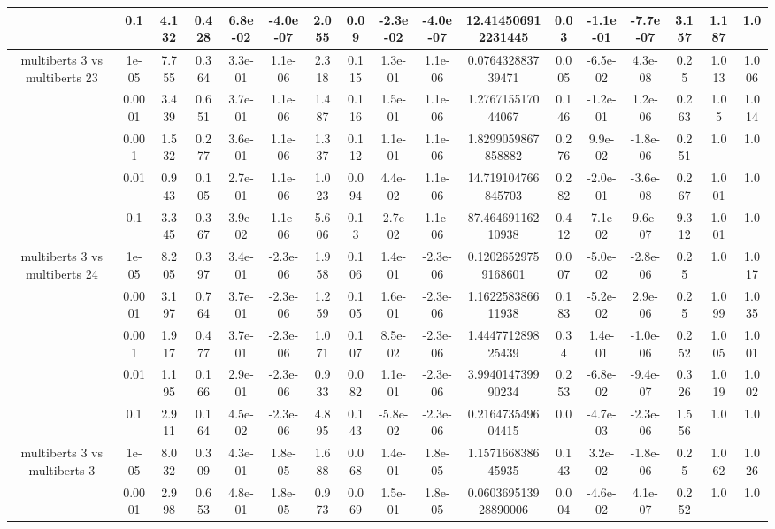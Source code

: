 \begin{tabular}{|c|c|c|c|c|c|c|c|c|c|c|c|c|c|c|c|c|}
 & 0.1 & 4.132 & 0.428 & 6.8e-02 & -4.0e-07 & 2.055 & 0.09 & -2.3e-02 & -4.0e-07 & 12.414506912231445 & 0.03 & -1.1e-01 & -7.7e-07 & 3.157 & 1.187 & 1.0 \\
\hline
\multirow{5}{*}{multiberts 3 vs multiberts 23} & 1e-05 & 7.755 & 0.364 & 3.3e-01 & 1.1e-06 & 2.318 & 0.115 & 1.3e-01 & 1.1e-06 & 0.076432883739471 & 0.005 & -6.5e-02 & 4.3e-08 & 0.25 & 1.013 & 1.006 \\
 & 0.0001 & 3.439 & 0.651 & 3.7e-01 & 1.1e-06 & 1.487 & 0.116 & 1.5e-01 & 1.1e-06 & 1.276715517044067 & 0.146 & -1.2e-01 & 1.2e-06 & 0.263 & 1.05 & 1.014 \\
 & 0.001 & 1.532 & 0.277 & 3.6e-01 & 1.1e-06 & 1.337 & 0.112 & 1.1e-01 & 1.1e-06 & 1.8299059867858882 & 0.276 & 9.9e-02 & -1.8e-06 & 0.251 & 1.0 & 1.0 \\
 & 0.01 & 0.943 & 0.105 & 2.7e-01 & 1.1e-06 & 1.023 & 0.094 & 4.4e-02 & 1.1e-06 & 14.719104766845703 & 0.282 & -2.0e-01 & -3.6e-08 & 0.267 & 1.001 & 1.0 \\
 & 0.1 & 3.345 & 0.367 & 3.9e-02 & 1.1e-06 & 5.606 & 0.13 & -2.7e-02 & 1.1e-06 & 87.46469116210938 & 0.412 & -7.1e-02 & 9.6e-07 & 9.312 & 1.001 & 1.0 \\
\hline
\multirow{5}{*}{multiberts 3 vs multiberts 24} & 1e-05 & 8.205 & 0.397 & 3.4e-01 & -2.3e-06 & 1.958 & 0.106 & 1.4e-01 & -2.3e-06 & 0.12026529759168601 & 0.007 & -5.0e-02 & -2.8e-06 & 0.25 & 1.0 & 1.017 \\
 & 0.0001 & 3.197 & 0.764 & 3.7e-01 & -2.3e-06 & 1.259 & 0.105 & 1.6e-01 & -2.3e-06 & 1.162258386611938 & 0.183 & -5.2e-02 & 2.9e-06 & 0.25 & 1.099 & 1.035 \\
 & 0.001 & 1.917 & 0.477 & 3.7e-01 & -2.3e-06 & 1.071 & 0.107 & 8.5e-02 & -2.3e-06 & 1.444771289825439 & 0.34 & 1.4e-01 & -1.0e-06 & 0.252 & 1.005 & 1.001 \\
 & 0.01 & 1.195 & 0.166 & 2.9e-01 & -2.3e-06 & 0.933 & 0.082 & 1.1e-01 & -2.3e-06 & 3.994014739990234 & 0.253 & -6.8e-02 & -9.4e-07 & 0.326 & 1.019 & 1.002 \\
 & 0.1 & 2.911 & 0.164 & 4.5e-02 & -2.3e-06 & 4.895 & 0.143 & -5.8e-02 & -2.3e-06 & 0.216473549604415 & 0.0 & -4.7e-03 & -2.3e-06 & 1.556 & 1.0 & 1.0 \\
\hline
\multirow{5}{*}{multiberts 3 vs multiberts 3} & 1e-05 & 8.032 & 0.309 & 4.3e-01 & 1.8e-05 & 1.688 & 0.068 & 1.4e-01 & 1.8e-05 & 1.157166838645935 & 0.143 & 3.2e-02 & -1.8e-06 & 0.25 & 1.062 & 1.026 \\
 & 0.0001 & 2.998 & 0.653 & 4.8e-01 & 1.8e-05 & 0.973 & 0.069 & 1.5e-01 & 1.8e-05 & 0.060369513928890006 & 0.004 & -4.6e-02 & 4.1e-07 & 0.252 & 1.0 & 1.0 \\

\end{tabular}
